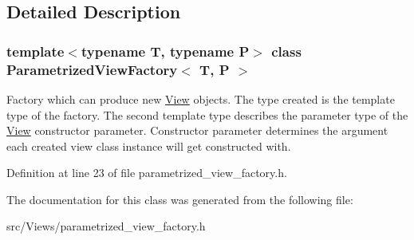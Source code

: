 \subsection{Detailed Description}
\subsubsection*{template$<$typename T, typename P$>$ class ParametrizedViewFactory$<$ T, P $>$}

Factory which can produce new \hyperlink{class_view}{View} objects. The type created is the template type of the factory. The second template type describes the parameter type of the \hyperlink{class_view}{View} constructor parameter. Constructor parameter determines the argument each created view class instance will get constructed with. 

Definition at line 23 of file parametrized\_\-view\_\-factory.h.

The documentation for this class was generated from the following file:\begin{CompactItemize}
\item 
src/Views/parametrized\_\-view\_\-factory.h\end{CompactItemize}
